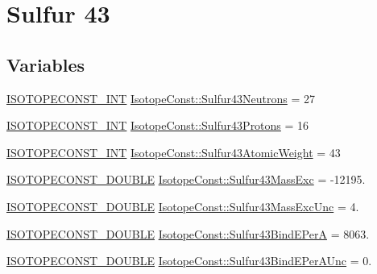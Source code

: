\hypertarget{group___isotope_const-_sulfur-_s43}{}\section{Sulfur 43}
\label{group___isotope_const-_sulfur-_s43}
\subsection*{Variables}
\begin{DoxyCompactItemize}
\item 
\mbox{\hyperlink{group___isotope_const-_macros_ga5f18360b3e99483a35c32d789e62621c}{I\+S\+O\+T\+O\+P\+E\+C\+O\+N\+S\+T\+\_\+\+I\+NT}} \mbox{\hyperlink{group___isotope_const-_sulfur-_s43_ga55539fe80db25fc5ecb70ab49e6b0ab5}{Isotope\+Const\+::\+Sulfur43\+Neutrons}} = 27
\item 
\mbox{\hyperlink{group___isotope_const-_macros_ga5f18360b3e99483a35c32d789e62621c}{I\+S\+O\+T\+O\+P\+E\+C\+O\+N\+S\+T\+\_\+\+I\+NT}} \mbox{\hyperlink{group___isotope_const-_sulfur-_s43_ga2bead5cc3e5cf531bd5ad4de3bb4742d}{Isotope\+Const\+::\+Sulfur43\+Protons}} = 16
\item 
\mbox{\hyperlink{group___isotope_const-_macros_ga5f18360b3e99483a35c32d789e62621c}{I\+S\+O\+T\+O\+P\+E\+C\+O\+N\+S\+T\+\_\+\+I\+NT}} \mbox{\hyperlink{group___isotope_const-_sulfur-_s43_ga7b118200955194e9b7297e656b586294}{Isotope\+Const\+::\+Sulfur43\+Atomic\+Weight}} = 43
\item 
\mbox{\hyperlink{group___isotope_const-_macros_ga8f45a7272ce02c0b4c65c44636ed719a}{I\+S\+O\+T\+O\+P\+E\+C\+O\+N\+S\+T\+\_\+\+D\+O\+U\+B\+LE}} \mbox{\hyperlink{group___isotope_const-_sulfur-_s43_ga378b392363ecdc4dece7d0a5ed4c2a4b}{Isotope\+Const\+::\+Sulfur43\+Mass\+Exc}} = -\/12195.
\item 
\mbox{\hyperlink{group___isotope_const-_macros_ga8f45a7272ce02c0b4c65c44636ed719a}{I\+S\+O\+T\+O\+P\+E\+C\+O\+N\+S\+T\+\_\+\+D\+O\+U\+B\+LE}} \mbox{\hyperlink{group___isotope_const-_sulfur-_s43_ga6e0161fc3ee25f0d2160025d46e63d0d}{Isotope\+Const\+::\+Sulfur43\+Mass\+Exc\+Unc}} = 4.
\item 
\mbox{\hyperlink{group___isotope_const-_macros_ga8f45a7272ce02c0b4c65c44636ed719a}{I\+S\+O\+T\+O\+P\+E\+C\+O\+N\+S\+T\+\_\+\+D\+O\+U\+B\+LE}} \mbox{\hyperlink{group___isotope_const-_sulfur-_s43_ga6407561cb88b4c59f67baa8af0f5d38e}{Isotope\+Const\+::\+Sulfur43\+Bind\+E\+PerA}} = 8063.
\item 
\mbox{\hyperlink{group___isotope_const-_macros_ga8f45a7272ce02c0b4c65c44636ed719a}{I\+S\+O\+T\+O\+P\+E\+C\+O\+N\+S\+T\+\_\+\+D\+O\+U\+B\+LE}} \mbox{\hyperlink{group___isotope_const-_sulfur-_s43_ga16c2a85e1856286855964430009191f9}{Isotope\+Const\+::\+Sulfur43\+Bind\+E\+Per\+A\+Unc}} = 0.

\end{DoxyCompactItemize}

